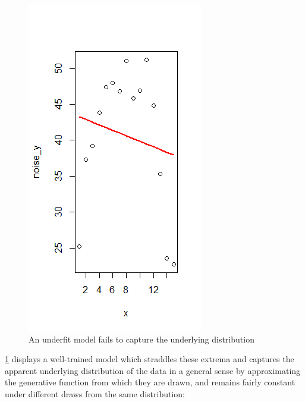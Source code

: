 \documentclass[12pt,twoside]{reedthesis}
\begin{document}
\begin{figure}
\centering
\includegraphics{figure/underfit.png}
\caption{\label{fig:underfit}An underfit model fails to capture the
underlying distribution}
\end{figure}
\ref{fig:underfit} displays a well-trained model which straddles these
extrema and captures the apparent underlying distribution of the data in
a general sense by approximating the generative function from which they
are drawn, and remains fairly constant under different draws from the
same distribution:
\end{document}
